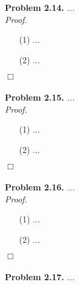 \documentclass{article}
\begin{document}



\textbf{Problem 2.14.}
\emph{...} \\



\emph{Proof.}
\begin{enumerate}
\item[(1)]
  ...

\item[(2)]
  ...
\end{enumerate}
$\Box$ \\\\






\textbf{Problem 2.15.}
\emph{...} \\



\emph{Proof.}
\begin{enumerate}
\item[(1)]
  ...

\item[(2)]
  ...
\end{enumerate}
$\Box$ \\\\






\textbf{Problem 2.16.}
\emph{...} \\



\emph{Proof.}
\begin{enumerate}
\item[(1)]
  ...

\item[(2)]
  ...
\end{enumerate}
$\Box$ \\\\






\textbf{Problem 2.17.}
\emph{...} \\
\end{document}
